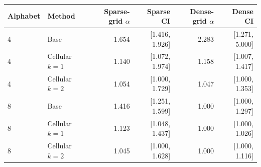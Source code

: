 \documentclass[11pt]{article}
\begin{document}
\begin{table}[htbp]
\centering
\small
\begin{tabular}{llrrrr}
\toprule
Alphabet & Method & Sparse-grid $\alpha$ & Sparse CI & Dense-grid $\alpha$ & Dense CI \\
\midrule
4 & Base & 1.654 & [1.416, 1.926] & 2.283 & [1.271, 5.000] \\
4 & Cellular $k=1$ & 1.140 & [1.072, 1.974] & 1.158 & [1.007, 1.417] \\
4 & Cellular $k=2$ & 1.054 & [1.000, 1.729] & 1.047 & [1.000, 1.353] \\
8 & Base & 1.416 & [1.251, 1.599] & 1.000 & [1.000, 1.297] \\
8 & Cellular $k=1$ & 1.123 & [1.048, 1.437] & 1.000 & [1.000, 1.026] \\
8 & Cellular $k=2$ & 1.045 & [1.000, 1.628] & 1.000 & [1.000, 1.116] \\
\bottomrule
\end{tabular}
\end{table}
\end{document}
